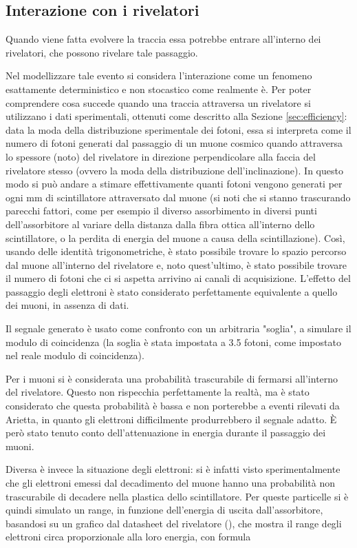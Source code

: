 \subsection{Interazione con i rivelatori}
Quando viene fatta evolvere la traccia essa potrebbe entrare all'interno dei rivelatori, che possono rivelare tale passaggio. 

Nel modellizzare tale evento si considera l'interazione come un fenomeno esattamente deterministico e non stocastico come realmente è. 
Per poter comprendere cosa succede quando una traccia attraversa un rivelatore si utilizzano i dati sperimentali, ottenuti come descritto alla Sezione \ref{sec:efficiency}: data la moda della distribuzione sperimentale dei fotoni, essa si interpreta come il numero di fotoni generati dal passaggio di un muone cosmico quando attraversa lo spessore (noto) del rivelatore in direzione perpendicolare alla faccia del rivelatore stesso (ovvero la moda della distribuzione dell'inclinazione). 
In questo modo si può andare a stimare effettivamente quanti fotoni vengono generati per ogni mm di scintillatore attraversato dal muone (si noti che si stanno trascurando parecchi fattori, come per esempio il diverso assorbimento in diversi punti dell'assorbitore al variare della distanza dalla fibra ottica all'interno dello scintillatore, o la perdita di energia del muone a causa della scintillazione). 
Così, usando delle identità trigonometriche, è stato possibile trovare lo spazio percorso dal muone all'interno del rivelatore e, noto quest'ultimo, è stato possibile trovare il numero di fotoni che ci si aspetta arrivino ai canali di acquisizione. 
L'effetto del passaggio degli elettroni \`e stato considerato perfettamente equivalente a quello dei muoni, in assenza di dati.

Il segnale generato \`e usato come confronto con un arbitraria "soglia", a simulare il modulo di coincidenza (la soglia \`e stata impostata a 3.5 fotoni, come impostato nel reale modulo di coincidenza).

Per i muoni si \`e considerata una probabilit\`a trascurabile di fermarsi all'interno del rivelatore. Questo non rispecchia perfettamente la realt\`a, ma \`e stato considerato che questa probabilit\`a \`e bassa e  non porterebbe a eventi rilevati da Arietta, in quanto gli elettroni difficilmente produrrebbero il segnale adatto. \`E per\`o stato tenuto conto dell'attenuazione in energia durante il passaggio dei muoni.

Diversa \`e invece la situazione degli elettroni: si \`e infatti visto sperimentalmente che gli elettroni emessi dal decadimento del muone hanno una probabilit\`a non trascurabile di decadere nella plastica dello scintillatore. Per queste particelle si \`e quindi simulato un range, in funzione dell'energia di uscita dall'assorbitore, basandosi su un grafico dal datasheet del rivelatore (\cite{bib:SiPM}), che mostra il range degli elettroni circa proporzionale alla loro energia, con formula

